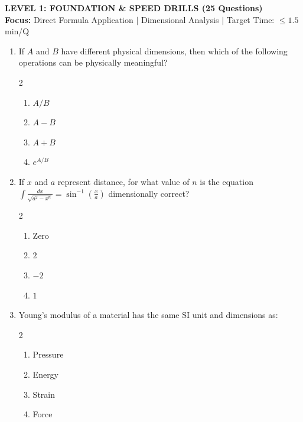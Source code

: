 \documentclass[11pt,a4paper]{article}
\begin{document}
\newpage
\begin{tcolorbox}[l1banner]
  {\Large \textbf{\textsf{LEVEL 1: FOUNDATION \& SPEED DRILLS (25 Questions)}}}\\[2pt]
  {\footnotesize \textbf{Focus:} Direct Formula Application $\vert$ Dimensional Analysis $\vert$ Target Time: $\le 1.5$ min/Q}
\end{tcolorbox}
\vspace{6pt}

\begin{enumerate}[label=\textbf{\textcolor{l1Green}{Q\arabic*.}},leftmargin=24pt,itemsep=10pt]

  \item If $A$ and $B$ have different physical dimensions, then which of the following operations can be physically meaningful?
  \begin{multicols}{2}
  \begin{enumerate}[label=\textbf{\textcolor{primaryDark}{(\Alph*)}},itemsep=2pt]
    \item $A / B$
    \item $A - B$
    \item $A + B$
    \item $e^{A/B}$
  \end{enumerate}
  \end{multicols}

  \item If $x$ and $a$ represent distance, for what value of $n$ is the equation $\displaystyle\int \frac{dx}{\sqrt{a^2 - x^n}} = \sin^{-1}\left(\frac{x}{a}\right)$ dimensionally correct?
  \begin{multicols}{2}
  \begin{enumerate}[label=\textbf{\textcolor{primaryDark}{(\Alph*)}},itemsep=2pt]
    \item Zero
    \item $2$
    \item $-2$
    \item $1$
  \end{enumerate}
  \end{multicols}

  \item Young's modulus of a material has the same SI unit and dimensions as:
  \begin{multicols}{2}
  \begin{enumerate}[label=\textbf{\textcolor{primaryDark}{(\Alph*)}},itemsep=2pt]
    \item Pressure
    \item Energy
    \item Strain
    \item Force
  \end{enumerate}
  \end{multicols}


\end{enumerate}
\end{document}

